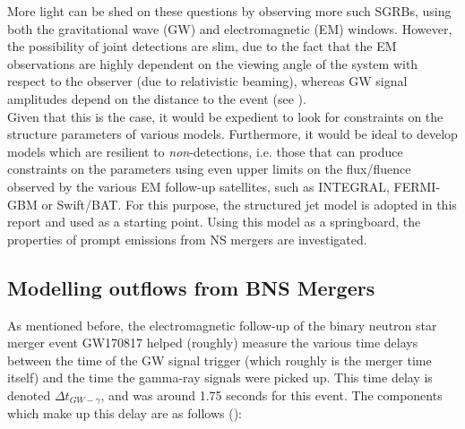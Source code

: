    More light can be shed on these questions by observing more such SGRBs, using both
    the gravitational wave (GW) and electromagnetic (EM) windows.  However, the
    possibility of joint detections are slim, due to the fact that the EM observations
    are highly dependent on the viewing angle of the system with respect to the observer
    (due to relativistic beaming), whereas GW signal amplitudes depend on the distance
    to the event (see \cite{seto_2015}).\\
    Given that this is the case, it would be expedient to look for constraints on the
    structure parameters of various models. Furthermore, it would be ideal to develop
    models which are resilient to \emph{non}-detections, i.e. those that can produce
    constraints on the parameters using even upper limits on the flux/fluence observed
    by the various EM follow-up satellites, such as INTEGRAL, FERMI-GBM or Swift/BAT.
    For this purpose, the structured jet model is adopted in this report and used as a
    starting point. Using this model as a springboard, the properties of prompt
    emissions from NS mergers are investigated.\\

    \subsection{Modelling outflows from BNS Mergers}\label{ssec:bns-outflows}

    As mentioned before, the electromagnetic follow-up of the binary neutron star merger
    event GW170817 helped (roughly) measure the various time delays between the time of
    the GW signal trigger (which roughly is the merger time itself) and the time the
    gamma-ray signals were picked up. This time delay is denoted $\Delta t_{GW-\gamma}$,
    and was around 1.75 seconds for this event.  The components which make up this delay
    are as follows (\cite{lazzati_2020}):

